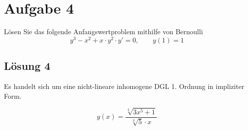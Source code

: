 \documentclass[main.tex]{subfiles}
\begin{document}
\section{Aufgabe 4}
Lösen Sie das folgende Anfangswertproblem mithilfe von Bernoulli
\[
    y^3 - x^2 + x \cdot y^2 \cdot y' = 0, \qquad y(1) = 1
\]

\subsection{Lösung 4}
Es handelt sich um eine nicht-lineare inhomogene DGL 1. Ordnung in impliziter Form.

$$
    y(x) = \frac{
        \sqrt[3]{3x^5 +1}
    }{
        \sqrt[3]{5}\cdot x
    }
$$
\end{document}
